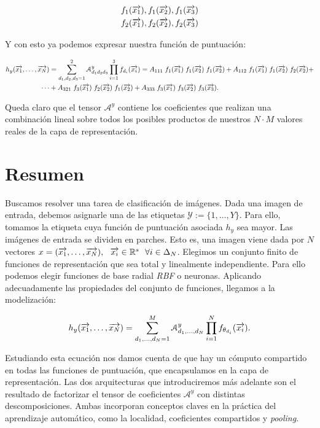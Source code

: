 \begin{equation}
	\begin{split}
		f_1(\overrightarrow{x_1}), f_1(\overrightarrow{x_2}), f_1(\overrightarrow{x_3}) \\
		f_2(\overrightarrow{x_1}), f_2(\overrightarrow{x_2}), f_2(\overrightarrow{x_3})
	\end{split}
\end{equation}

Y con esto ya podemos expresar nuestra función de puntuación:

\begin{equation}
	\begin{split}
		h_y(\overrightarrow{x_1}, \ldots, \overrightarrow{x_N}) &= \sum_{d_1, d_2, d_3 = 1}^{2} \mathcal{A}^y_{d_1 d_2 d_3} \prod_{i = 1}^3 f_{d_i}(\overrightarrow{x_i}) = A_{111} \; f_1(\overrightarrow{x_1}) \; f_1(\overrightarrow{x_2}) \; f_1(\overrightarrow{x_2}) + A_{112} \; f_1(\overrightarrow{x_1}) \; f_1(\overrightarrow{x_2}) \; f_2(\overrightarrow{x_2}) + \\
		\cdots &+ A_{321} \; f_3(\overrightarrow{x_1}) \; f_2(\overrightarrow{x_2}) \; f_1(\overrightarrow{x_2}) + A_{333} \; f_3(\overrightarrow{x_1}) \; f_3(\overrightarrow{x_2}) \; f_3(\overrightarrow{x_3}).
	\end{split}
\end{equation}

Queda claro que el tensor $\mathcal{A}^y$ contiene los coeficientes que realizan una combinación lineal sobre todos los posibles productos de nuestros $N \cdot M$ valores reales de la capa de representación.

\section{Resumen}

Buscamos resolver una tarea de clasificación de imágenes. Dada una imagen de entrada, debemos asignarle una de las etiquetas $\mathcal{Y} := \{1, \ldots, Y\}$. Para ello, tomamos la etiqueta cuya función de puntuación asociada $h_y$ sea mayor. Las imágenes de entrada se dividen en parches. Esto es, una imagen viene dada por $N$ vectores $x = (\overrightarrow{x_1}, \ldots, \overrightarrow{x_N}), \ \  \overrightarrow{x_i} \in \mathbb{R}^s \ \  \forall i \in \Delta_{N}$. Elegimos un conjunto finito de funciones de representación que sea total y linealmente independiente. Para ello podemos elegir funciones de base radial \textit{RBF} o neuronas. Aplicando adecuadamente las propiedades del conjunto de funciones, llegamos a la modelización:

\begin{equation}
	h_y(\overrightarrow{x_1}, \ldots, \overrightarrow{x_N}) = \sum_{d_1, \ldots, d_N = 1}^{M} \mathcal{A}^y_{d_1, \ldots, d_N} \prod_{i = 1}^N f_{\theta_{d_i}}(\overrightarrow{x_i}).
\end{equation}

Estudiando esta ecuación nos damos cuenta de que hay un cómputo compartido en todas las funciones de puntuación, que encapsulamos en la capa de representación. Las dos arquitecturas que introduciremos más adelante son el resultado de factorizar el tensor de coeficientes $\mathcal{A}^y$ con distintas descomposiciones. Ambas incorporan conceptos claves en la práctica del aprendizaje automático, como la localidad, coeficientes compartidos y \textit{pooling}.
